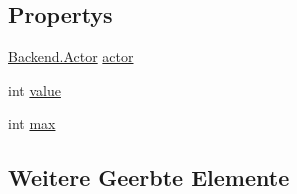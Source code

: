 \subsection*{Propertys}
\begin{DoxyCompactItemize}
\item 
\hyperlink{class_gruppe22_1_1_backend_1_1_actor}{Backend.\-Actor} \hyperlink{class_gruppe22_1_1_client_1_1_orb_a4e41fb8ca80e0e571c81667475c43d70}{actor}
\item 
int \hyperlink{class_gruppe22_1_1_client_1_1_orb_a7ed4893141f482fed4ec625869b87802}{value}
\item 
int \hyperlink{class_gruppe22_1_1_client_1_1_orb_ab6d555ddf688d3bb1faae3e6a2f6dfed}{max}
\end{DoxyCompactItemize}
\subsection*{Weitere Geerbte Elemente}


